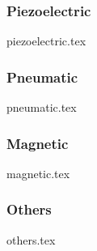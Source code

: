         \subsubsection{Piezoelectric}
        {piezoelectric.tex}
        
        \subsubsection{Pneumatic}
        {pneumatic.tex}

        \subsubsection{Magnetic}
        {magnetic.tex}

        \subsubsection{Others}
        {others.tex}